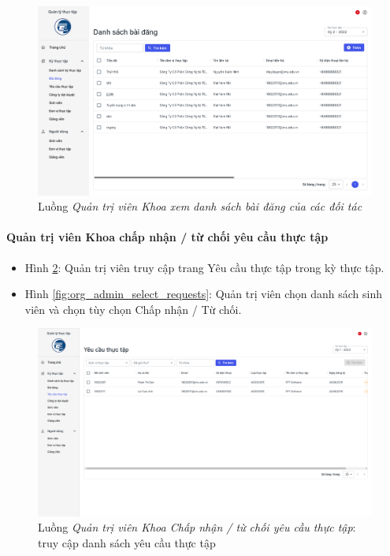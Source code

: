 \documentclass[./../main.tex]{subfiles}
\begin{document}
\begin{figure}[]
	\includegraphics[width=\linewidth]{./images/image71.png}
	\caption{Luồng \emph{Quản trị viên Khoa xem danh sách bài đăng của các đối tác}}
	\label{fig:orgadmin_list_posts}
\end{figure}

\paragraph*{Quản trị viên Khoa chấp nhận / từ chối yêu cầu thực tập}

\begin{itemize}
	\item Hình \ref{fig:org_admin_access_list_requests}: Quản trị viên truy cập trang Yêu cầu thực tập trong kỳ thực tập. 
	\item Hình \ref{fig:org_admin_select_requests}: Quản trị viên chọn danh sách sinh viên và chọn tùy chọn Chấp nhận / Từ chối.
\end{itemize}

\begin{figure}[]
	\includegraphics[width=\linewidth]{./images/image72.png}
	\caption{Luồng \emph{Quản trị viên Khoa Chấp nhận / từ chối yêu cầu thực tập}: truy cập danh sách yêu cầu thực tập}
	\label{fig:org_admin_access_list_requests}
\end{figure}
\end{document}

